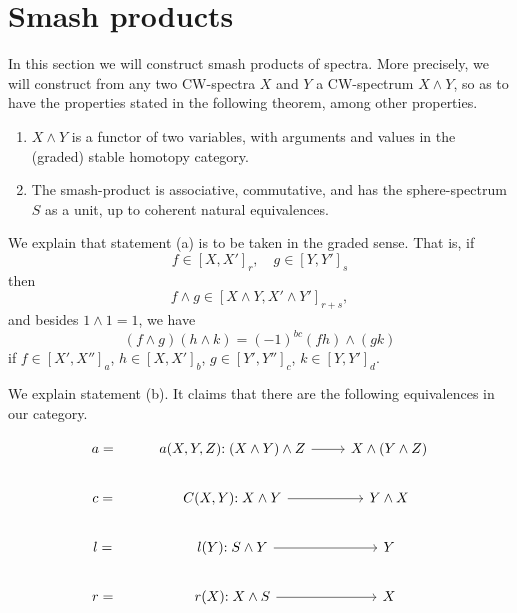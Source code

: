 \documentclass[../main]{subfiles}
\begin{document}

\chapter{Smash products}
\label{sec:p3c04}
    In this section we will construct smash products of spectra.
More precisely, we will construct from any two CW-spectra $X$ and $Y$ a CW-spectrum $X \wedge Y$, so as to have the properties stated in the following theorem, among other properties.
\begin{theorem}\label{thm:p3c04.1}
    \begin{enumerate}[label=(\alph*)] 
        \item $X \wedge Y$ is a functor of two variables, with arguments and values in the (graded) stable homotopy category.
        \item The smash-product is associative, commutative, and has the sphere-spectrum $S$ as a unit, up to coherent natural equivalences.
    \end{enumerate}
\end{theorem}

We explain that statement (a) is to be taken in the graded sense.
That is, if
\[
    f \in [X, X']_r, \quad g \in [Y, Y']_s
\]
then
\[
    f \wedge g \in [X \wedge Y, X' \wedge Y']_{r + s},
\]
and besides $1 \wedge 1 = 1$, we have
\[
    (f \wedge g) (h \wedge k) = (-1)^{bc} (fh) \wedge (gk)
\]
if $f \in [X', X'']_{a}$, $h \in [X, X']_b$, $g \in [Y', Y'']_c$, $k \in [Y, Y']_d$.

We explain statement (b).
It claims that there are the following equivalences in our category.

\[\begin{tikzcd}
	{a=} & {a(X,Y,Z)} {:(X\wedge Y)\wedge Z} & {X\wedge(Y\wedge Z)} \\
	{c=} & {C(X,Y)} {:X\wedge Y} & {Y\wedge X} \\
	{l=} & {l(Y)} {:S\wedge Y} & Y \\
	{r=} & {r(X)}  {:X\wedge S} & X
	\arrow[from=1-2, to=1-3]
	\arrow[from=2-2, to=2-3]
	\arrow[from=3-2, to=3-3]
	\arrow[from=4-2, to=4-3]
\end{tikzcd}\]
\end{document}
